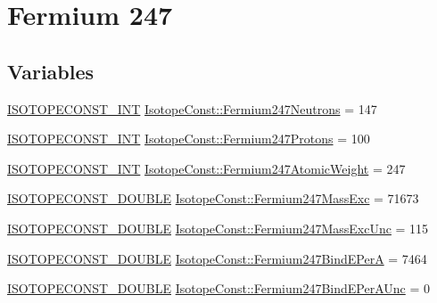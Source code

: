 \hypertarget{group___isotope_const-_fermium-_fm247}{}\section{Fermium 247}
\label{group___isotope_const-_fermium-_fm247}
\subsection*{Variables}
\begin{DoxyCompactItemize}
\item 
\mbox{\hyperlink{group___isotope_const-_macros_ga5f18360b3e99483a35c32d789e62621c}{I\+S\+O\+T\+O\+P\+E\+C\+O\+N\+S\+T\+\_\+\+I\+NT}} \mbox{\hyperlink{group___isotope_const-_fermium-_fm247_ga55e076cdf6ccf6dd813599d8f692025c}{Isotope\+Const\+::\+Fermium247\+Neutrons}} = 147
\item 
\mbox{\hyperlink{group___isotope_const-_macros_ga5f18360b3e99483a35c32d789e62621c}{I\+S\+O\+T\+O\+P\+E\+C\+O\+N\+S\+T\+\_\+\+I\+NT}} \mbox{\hyperlink{group___isotope_const-_fermium-_fm247_gabaaa0335b460009dff4a44428fd36ac4}{Isotope\+Const\+::\+Fermium247\+Protons}} = 100
\item 
\mbox{\hyperlink{group___isotope_const-_macros_ga5f18360b3e99483a35c32d789e62621c}{I\+S\+O\+T\+O\+P\+E\+C\+O\+N\+S\+T\+\_\+\+I\+NT}} \mbox{\hyperlink{group___isotope_const-_fermium-_fm247_ga93c8cf98efade7a2cd1a647b7f9267f0}{Isotope\+Const\+::\+Fermium247\+Atomic\+Weight}} = 247
\item 
\mbox{\hyperlink{group___isotope_const-_macros_ga8f45a7272ce02c0b4c65c44636ed719a}{I\+S\+O\+T\+O\+P\+E\+C\+O\+N\+S\+T\+\_\+\+D\+O\+U\+B\+LE}} \mbox{\hyperlink{group___isotope_const-_fermium-_fm247_gaf081434e5231bb7d45581f4555ad6490}{Isotope\+Const\+::\+Fermium247\+Mass\+Exc}} = 71673
\item 
\mbox{\hyperlink{group___isotope_const-_macros_ga8f45a7272ce02c0b4c65c44636ed719a}{I\+S\+O\+T\+O\+P\+E\+C\+O\+N\+S\+T\+\_\+\+D\+O\+U\+B\+LE}} \mbox{\hyperlink{group___isotope_const-_fermium-_fm247_ga9168871d323e946e38a6f25a8caaae66}{Isotope\+Const\+::\+Fermium247\+Mass\+Exc\+Unc}} = 115
\item 
\mbox{\hyperlink{group___isotope_const-_macros_ga8f45a7272ce02c0b4c65c44636ed719a}{I\+S\+O\+T\+O\+P\+E\+C\+O\+N\+S\+T\+\_\+\+D\+O\+U\+B\+LE}} \mbox{\hyperlink{group___isotope_const-_fermium-_fm247_ga7588dc6eed44db5de4b06f623f5c78a0}{Isotope\+Const\+::\+Fermium247\+Bind\+E\+PerA}} = 7464
\item 
\mbox{\hyperlink{group___isotope_const-_macros_ga8f45a7272ce02c0b4c65c44636ed719a}{I\+S\+O\+T\+O\+P\+E\+C\+O\+N\+S\+T\+\_\+\+D\+O\+U\+B\+LE}} \mbox{\hyperlink{group___isotope_const-_fermium-_fm247_ga05be2d4a33170b033b54c76a14e75fb9}{Isotope\+Const\+::\+Fermium247\+Bind\+E\+Per\+A\+Unc}} = 0

\end{DoxyCompactItemize}

